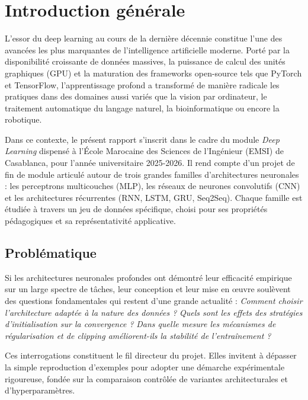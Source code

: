\documentclass[11pt,a4paper]{article}
\begin{document}
\listoftables
{}
\newpage

\section{Introduction générale}

L'essor du deep learning au cours de la dernière décennie constitue l'une des avancées
les plus marquantes de l'intelligence artificielle moderne. Porté par la disponibilité
croissante de données massives, la puissance de calcul des unités graphiques (GPU) et
la maturation des frameworks open-source tels que PyTorch et TensorFlow, l'apprentissage
profond a transformé de manière radicale les pratiques dans des domaines aussi variés
que la vision par ordinateur, le traitement automatique du langage naturel, la bioinformatique
ou encore la robotique.

Dans ce contexte, le présent rapport s'inscrit dans le cadre du module \textit{Deep Learning}
dispensé à l'École Marocaine des Sciences de l'Ingénieur (EMSI) de Casablanca, pour
l'année universitaire 2025-2026. Il rend compte d'un projet de fin de module articulé
autour de trois grandes familles d'architectures neuronales : les perceptrons multicouches
(MLP), les réseaux de neurones convolutifs (CNN) et les architectures récurrentes
(RNN, LSTM, GRU, Seq2Seq). Chaque famille est étudiée à travers un jeu de données
spécifique, choisi pour ses propriétés pédagogiques et sa représentativité applicative.

\subsection{Problématique}

Si les architectures neuronales profondes ont démontré leur efficacité empirique sur
un large spectre de tâches, leur conception et leur mise en \oe{}uvre soulèvent des
questions fondamentales qui restent d'une grande actualité : \textit{Comment choisir
l'architecture adaptée à la nature des données ?} \textit{Quels sont les effets des
stratégies d'initialisation sur la convergence ?} \textit{Dans quelle mesure les mécanismes
de régularisation et de clipping améliorent-ils la stabilité de l'entraînement ?}

Ces interrogations constituent le fil directeur du projet. Elles invitent à dépasser
la simple reproduction d'exemples pour adopter une démarche expérimentale rigoureuse,
fondée sur la comparaison contrôlée de variantes architecturales et d'hyperparamètres.
\end{document}

